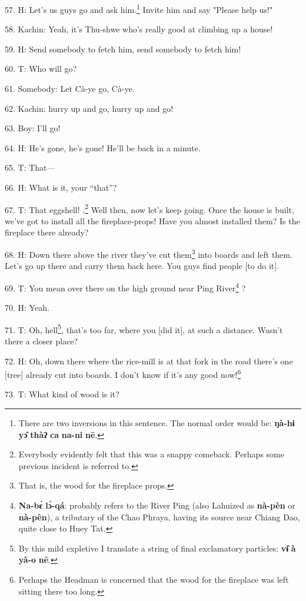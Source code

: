 57. H: Let's us guys go and ask him.\footnote{There are two inversions in this sentence. The normal order would be: \textbf{ŋà-hɨ} \textbf{yɔ̂} \textbf{thàʔ} \textbf{ca} \textbf{na-ni} \textbf{nē}.} Invite him and say "Please
help us!"

58. Kachin: Yeah, it's Thu-shwe who's really good at climbing up a house!

59. H: Send somebody to fetch him, send somebody to fetch him!

60. T: Who will go?

61. Somebody: Let Cà-ye go, Cà-ye.

62. Kachin: hurry up and go, hurry up and go!

63. Boy: I'll go!

64. H: He's gone, he's gone! He'll be back in a minute.

65. T: That---

66. H: What is it, your ``that''?

67. T: That eggshell! .\footnote{Everybody evidently felt that this was a snappy comeback. Perhaps some previous incident is referred to.} Well then, now let's keep
going. Once the house is built, we've got to install all the fireplace-props!
Have you almost installed them? Is the fireplace there already?

68. H: Down there above the river they've cut them\footnote{That is, the wood for the fireplace props.} into boards and left them.
Let's go up there and carry them back here. You guys find people [to do it].

69. T: You mean over there on the high ground near Ping River\footnote{\textbf{Na-bɛ̀} \textbf{lɔ̀-qá}: probably refers to the River Ping (also Lahuized as \textbf{nà-pèn} or \textbf{nà-pên}), a tributary of the Chao Phraya, having its source near Chiang Dao, quite close to Huey Tat.} ?

70. H: Yeah.

71. T: Oh, hell\footnote{By this mild expletive I translate a string of final exclamatory particles: \textbf{vɨ̂} \textbf{à} \textbf{yâ-o} \textbf{nē}.}, that's too far, where you [did it], at such a distance. Wasn't
there a closer place?

72. H: Oh, down there where the rice-mill is at that fork in the road there's one
[tree] already cut into boards. I don't know if it's any good now!\footnote{Perhaps the Headman is concerned that the wood for the fireplace was left sitting there too long.}

73. T: What kind of wood is it?

